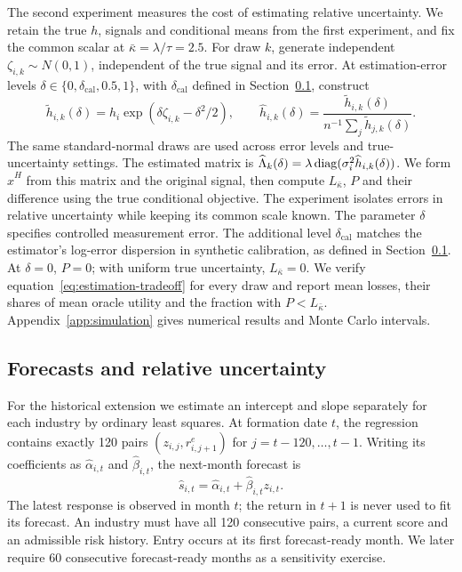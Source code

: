 The second experiment measures the cost of estimating relative uncertainty. We retain the true $h$, signals and conditional means from the first experiment, and fix the common scalar at $\bar\kappa=\lambda/\tau=2.5$. For draw $k$, generate independent $\zeta_{i,k}\sim N(0,1)$, independent of the true signal and its error. At estimation-error levels $\delta\in\{0,\delta_{\mathrm{cal}},0.5,1\}$, with $\delta_{\mathrm{cal}}$ defined in Section~\ref{sec:forecast-method}, construct
\begin{equation}
\widetilde h_{i,k}(\delta)=h_i\exp(\delta\zeta_{i,k}-\delta^2/2),\qquad
\widehat h_{i,k}(\delta)=\frac{\widetilde h_{i,k}(\delta)}{n^{-1}\sum_j\widetilde h_{j,k}(\delta)}.
\label{eq:controlled-h-error}
\end{equation}
The same standard-normal draws are used across error levels and true-uncertainty settings. The estimated matrix is $\widehat\Lambda_k(\delta)=\lambda\operatorname{diag}(\sigma_i^2\widehat h_{i,k}(\delta))$. We form $\widehat x^H$ from this matrix and the original signal, then compute $L_{\bar\kappa}$, $P$ and their difference using the true conditional objective. The experiment isolates errors in relative uncertainty while keeping its common scale known. The parameter $\delta$ specifies controlled measurement error. The additional level $\delta_{\mathrm{cal}}$ matches the estimator's log-error dispersion in synthetic calibration, as defined in Section~\ref{sec:forecast-method}. At $\delta=0$, $P=0$; with uniform true uncertainty, $L_{\bar\kappa}=0$. We verify equation~\eqref{eq:estimation-tradeoff} for every draw and report mean losses, their shares of mean oracle utility and the fraction with $P<L_{\bar\kappa}$. Appendix~\ref{app:simulation} gives numerical results and Monte Carlo intervals.

\subsection{Forecasts and relative uncertainty}
\label{sec:forecast-method}
For the historical extension we estimate an intercept and slope separately for each industry by ordinary least squares. At formation date $t$, the regression contains exactly 120 pairs $(z_{i,j},r^e_{i,j+1})$ for $j=t-120,\ldots,t-1$. Writing its coefficients as $\widehat\alpha_{i,t}$ and $\widehat\beta_{i,t}$, the next-month forecast is
\begin{equation}
\widehat s_{i,t}=\widehat\alpha_{i,t}+\widehat\beta_{i,t}z_{i,t}.
\label{eq:forecast}
\end{equation}
The latest response is observed in month $t$; the return in $t+1$ is never used to fit its forecast. An industry must have all 120 consecutive pairs, a current score and an admissible risk history. Entry occurs at its first forecast-ready month. We later require 60 consecutive forecast-ready months as a sensitivity exercise.

